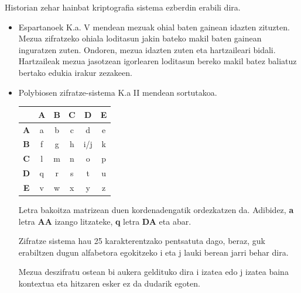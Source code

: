 \documentclass[12pt]{basque-book}
\begin{document}
Historian zehar hainbat kriptografia sistema ezberdin erabili dira.
\begin{itemize}
    \item Espartanoek K.a. V mendean mezuak ohial baten gainean idazten zituzten. Mezua zifratzeko ohiala loditasun jakin bateko makil baten gainean inguratzen zuten. Ondoren, mezua idazten zuten eta hartzaileari bidali. Hartzaileak mezua jasotzean igorlearen loditasun bereko makil batez baliatuz bertako edukia irakur zezakeen.
    
    
    \newpage
    
    
    \item Polybiosen zifratze-sistema K.a II mendean sortutakoa. 
    \begin{center}
        \begin{tabular}{ c |c |c| c| c| c| }
            & \textbf{A}  & \textbf{B} & \textbf{C} & \textbf{D} & \textbf{E} \\
             \hline
            \textbf{A}  &a  & b & c & d & e \\ 
            \hline
            \textbf{B}  &f  & g & h & i/j & k\\  
            \hline
            \textbf{C}  & l  & m & n & o & p \\
            \hline
            \textbf{D}  & q  & r & s & t & u\\
            \hline
            \textbf{E}  & v  & w & x & y & z
        \end{tabular}
    \end{center}
    
    Letra bakoitza matrizean duen kordenadengatik ordezkatzen da. Adibidez, \textbf{a} letra \textbf{AA} izango litzateke, \textbf{q} letra \textbf{DA} eta abar.
    
    Zifratze sistema hau 25 karakterentzako pentsatuta dago, beraz, guk erabiltzen dugun alfabetora egokitzeko i eta j lauki berean jarri behar dira.
    
    Mezua deszifratu ostean bi aukera geldituko dira i izatea edo j izatea baina kontextua eta hitzaren esker ez da dudarik egoten.
    

\end{itemize}
\end{document}
